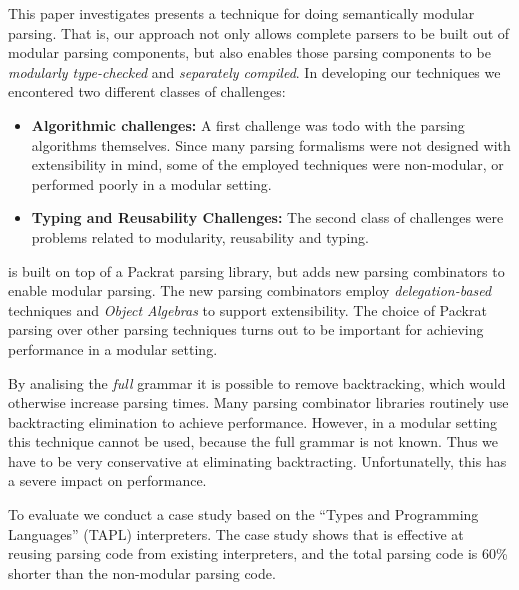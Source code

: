 
This paper investigates presents a technique for doing semantically
modular parsing.  That is, our approach not only allows complete
parsers to be built out of modular parsing components, but also enables
those parsing components to be \emph{modularly type-checked} and
\emph{separately compiled}. In developing our techniques we encontered 
two different classes of challenges:

\begin{itemize}

\item {\bf Algorithmic challenges:} A first challenge was todo with
  the parsing algorithms themselves. Since many parsing formalisms
  were not designed with extensibility in mind, some of the employed 
  techniques were non-modular, or performed poorly in a modular setting. 

\item {\bf Typing and Reusability Challenges:} The second class of
  challenges were problems related to modularity, reusability and
  typing.

\end{itemize}

\name is built on top of a Packrat parsing
library, but adds new parsing combinators to enable modular
parsing. The new parsing combinators employ \emph{delegation-based}
techniques and \emph{Object Algebras} to support extensibility. The
choice of Packrat parsing over other parsing techniques turns out to
be important for achieving performance in a modular
setting. 


  By analising the \emph{full} grammar it is possible to remove
  backtracking, which would otherwise increase parsing times. Many
  parsing combinator libraries routinely use backtracting elimination
  to achieve performance. However, in a modular setting this technique
  cannot be used, because the full grammar is not known. Thus we have
  to be very conservative at eliminating backtracting. Unfortunatelly,
  this has a severe impact on performance.

  To evaluate \name we conduct a case study based on the ``Types and
  Programming Languages'' (TAPL) interpreters.  The case study shows
  that \name is effective at reusing parsing code from existing
  interpreters, and the total parsing code is 60\% shorter than the
  non-modular parsing code.

